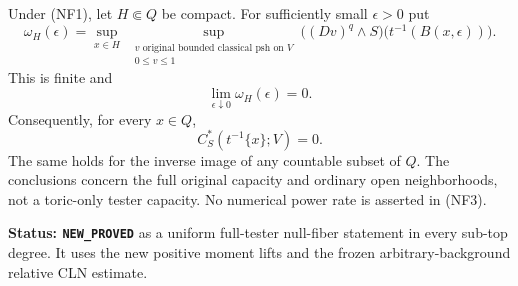 \begin{theorem}
\label{thm:r12-null-proper-moment-fibers}
Under (NF1), let $H\Subset Q$ be compact. For sufficiently
small $\epsilon>0$ put
\[
 \omega_H(\epsilon)=
   \sup_{x\in H}\ \sup_{\substack{v\text{ original bounded classical psh on }V\\
                                  0\leq v\leq1}}
     \bigl((Dv)^q\wedge S\bigr)
                           \bigl(t^{-1}(B(x,\epsilon))\bigr).
 \tag{NF2}
\]
This is finite and
\[
                  \lim_{\epsilon\downarrow0}\omega_H(\epsilon)=0.
 \tag{NF3}
\]
Consequently, for every $x\in Q$,
\[
                    C_S^*(t^{-1}\{x\};V)=0.
 \tag{NF4}
\]
The same holds for the inverse image of any countable subset
of $Q$. The conclusions concern the full original capacity
and ordinary open neighborhoods, not a toric-only tester capacity.
No numerical power rate is asserted in (NF3).
\end{theorem}

\noindent\textbf{Status: \texttt{NEW\_PROVED}} as a
uniform full-tester null-fiber statement in every sub-top
degree. It uses the new positive moment lifts and the frozen
arbitrary-background relative CLN estimate.


